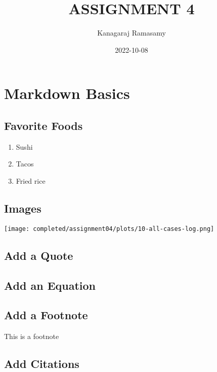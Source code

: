 \documentclass[
]{article}
\title{ASSIGNMENT 4}
\author{Kanagaraj Ramasamy}
\date{2022-10-08}
\providecommand{\tightlist}{%
  \setlength{\itemsep}{0pt}\setlength{\parskip}{0pt}}
\begin{document}
\maketitle

\hypertarget{markdown-basics}{%
\section{Markdown Basics}\label{markdown-basics}}

\hypertarget{favorite-foods}{%
\subsection{Favorite Foods}\label{favorite-foods}}

\begin{enumerate}
\def\labelenumi{\arabic{enumi}.}
\tightlist
\item
  Sushi
\item
  Tacos
\item
  Fried rice
\end{enumerate}

\hypertarget{images}{%
\subsection{Images}\label{images}}

\texttt{[image: completed/assignment04/plots/10-all-cases-log.png]}

\hypertarget{add-a-quote}{%
\subsection{Add a Quote}\label{add-a-quote}}

\hypertarget{add-an-equation}{%
\subsection{Add an Equation}\label{add-an-equation}}

\hypertarget{add-a-footnote}{%
\subsection{Add a Footnote}\label{add-a-footnote}}

This is a footnote

\hypertarget{add-citations}{%
\subsection{Add Citations}\label{add-citations}}
\end{document}

